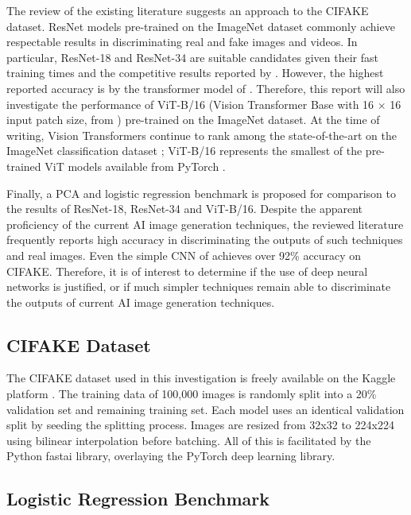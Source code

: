 The review of the existing literature suggests an approach to the CIFAKE dataset. ResNet models pre-trained on the ImageNet dataset commonly achieve respectable results in discriminating real and fake images and videos. In particular, ResNet-18 and ResNet-34 are suitable candidates given their fast training times and the competitive results reported by \cite{guarnera_2023}. However, the highest reported accuracy is by the transformer model of \cite{wang_2022}. Therefore, this report will also investigate the performance of ViT-B/16 (Vision Transformer Base with 16 $\times$ 16 input patch size, from \cite{dosovitskiy_2021}) pre-trained on the ImageNet dataset. At the time of writing, Vision Transformers continue to rank among the state-of-the-art on the ImageNet classification dataset \cite{paperswithcode_2023}; ViT-B/16 represents the smallest of the pre-trained ViT models available from PyTorch \cite{torchcontributors_visiontransformer}.

Finally, a PCA and logistic regression benchmark is proposed for comparison to the results of ResNet-18, ResNet-34 and ViT-B/16. Despite the apparent proficiency of the current AI image generation techniques, the reviewed literature frequently reports high accuracy in discriminating the outputs of such techniques and real images. Even the simple CNN of \cite{bird_2023} achieves over 92\% accuracy on CIFAKE. Therefore, it is of interest to determine if the use of deep neural networks is justified, or if much simpler techniques remain able to discriminate the outputs of current AI image generation techniques.

\subsection{CIFAKE Dataset}

The CIFAKE dataset used in this investigation is freely available on the Kaggle platform \cite{bird_2023b}. The training data of 100,000 images is randomly split into a 20\% validation set and remaining training set. Each model uses an identical validation split by seeding the splitting process. Images are resized from 32x32 to 224x224 using bilinear interpolation before batching. All of this is facilitated by the Python fastai library, overlaying the PyTorch deep learning library.

\subsection{Logistic Regression Benchmark}

